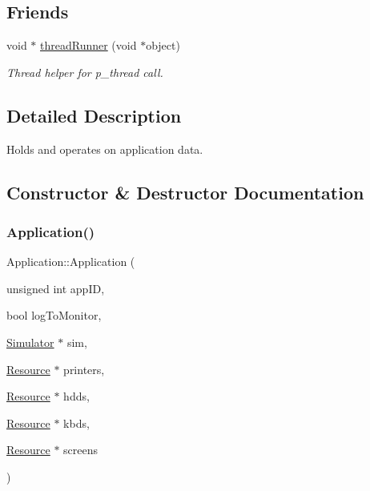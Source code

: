 \subsection*{Friends}
\begin{DoxyCompactItemize}
\item 
void $\ast$ \hyperlink{class_application_ae5e6102d305713891fb23b83d4acf306}{thread\+Runner} (void $\ast$object)
\begin{DoxyCompactList}\small\item\em Thread helper for p\+\_\+thread call. \end{DoxyCompactList}\end{DoxyCompactItemize}


\subsection{Detailed Description}
Holds and operates on application data. 

\subsection{Constructor \& Destructor Documentation}
\hypertarget{class_application_a1e27f766c7406acc8b558d9ae9833532}{}\label{class_application_a1e27f766c7406acc8b558d9ae9833532} 
\subsubsection{\texorpdfstring{Application()}{Application()}}
{\footnotesize\ttfamily Application\+::\+Application (\begin{DoxyParamCaption}\item[{unsigned int}]{app\+ID,  }\item[{bool}]{log\+To\+Monitor,  }\item[{\hyperlink{class_simulator}{Simulator} $\ast$}]{sim,  }\item[{\hyperlink{class_resource}{Resource} $\ast$}]{printers,  }\item[{\hyperlink{class_resource}{Resource} $\ast$}]{hdds,  }\item[{\hyperlink{class_resource}{Resource} $\ast$}]{kbds,  }\item[{\hyperlink{class_resource}{Resource} $\ast$}]{screens }\end{DoxyParamCaption})}




